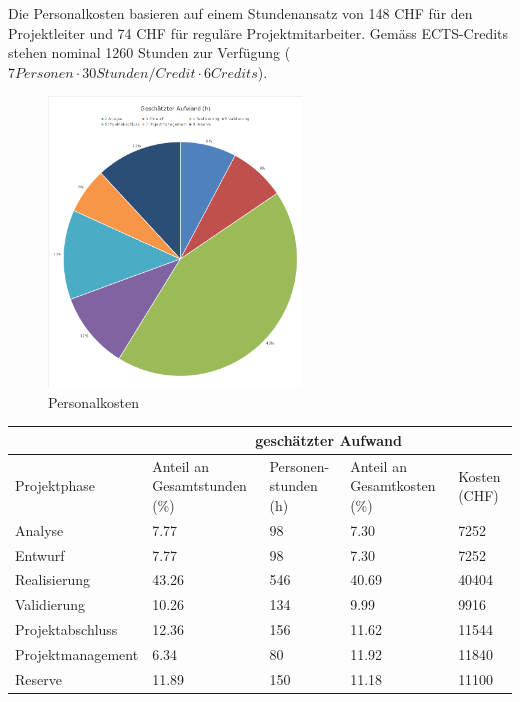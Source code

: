 

Die  Personalkosten  basieren  auf  einem  Stundenansatz  von  148  CHF  f\"ur
den  Projektleiter und  74 CHF  f\"ur regul\"are  Projektmitarbeiter. Gem\"ass
ECTS-Credits stehen nominal 1260 Stunden zur Verf\"ugung ($7 Personen \cdot 30
Stunden/Credit \cdot 6 Credits$).

\begin{figure}[h!]
\centering
        \includegraphics[width=0.6\textwidth]{images/budget.png}
		\caption{Personalkosten}
\end{figure}

\begin{center}
    \begin{tabular}{lp{20mm}p{20mm}p{20mm}p{20mm}}
        \toprule
                           & \multicolumn{4}{c}{gesch\"atzter Aufwand} \\
        \midrule
        Projektphase       & Anteil an Gesamtstunden (\%) & Personen-stunden (h) & Anteil an Gesamtkosten (\%) & Kosten (CHF) \\
        \midrule
        Analyse            &                         7.77 &                  98 &                        7.30 &        7252 \\
        Entwurf            &                         7.77 &                  98 &                        7.30 &        7252 \\
        Realisierung       &                        43.26 &                 546 &                       40.69 &       40404 \\
        Validierung        &                        10.26 &                 134 &                        9.99 &        9916 \\
        Projektabschluss   &                        12.36 &                 156 &                       11.62 &       11544 \\
        Projektmanagement  &                         6.34 &                  80 &                       11.92 &       11840 \\
        Reserve            &                        11.89 &                 150 &                       11.18 &       11100 \\
        \bottomrule
    \end{tabular}
\end{center}
